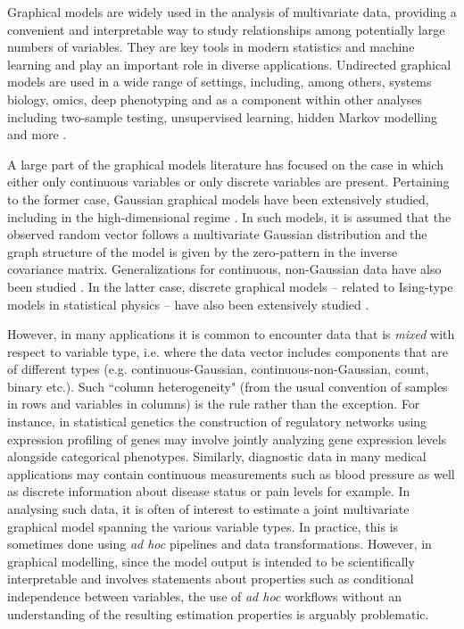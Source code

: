 Graphical models are widely used in the analysis of multivariate data, providing a convenient and interpretable way to study relationships among potentially large numbers of variables. They are key tools in modern statistics and machine learning and play an important role in diverse applications. Undirected graphical models are used in a wide range of settings, including, among others, systems biology, omics, deep phenotyping \citep[see, e.g.][]{dobra2004,Finegold11,monti2014}
and as a component within other analyses including two-sample testing, unsupervised learning, hidden Markov modelling and more  \citep[examples include][]{wei2007,verzelen2009,stadler2013, stadler2015,perrakis2021}. 

A large part of the graphical models literature has focused on the case in which either only continuous variables or only discrete variables are present. 
Pertaining to the former case, Gaussian graphical models have been extensively studied, including in the high-dimensional regime \citep[see among others][]{Meinshausen06,Friedman08,Banerjee08,Lam09,Yuan10,Ravikumar11,Cai11}. In such models, it is assumed that the observed random vector follows a multivariate Gaussian distribution and the graph structure of the model is given by the zero-pattern in the inverse covariance matrix. Generalizations for continuous, non-Gaussian data have also been studied \citep{Miyamura06,Liu09,Finegold11}. In the latter case, discrete graphical models -- related to Ising-type models in statistical physics -- have also been extensively studied \citep[see e.g.][]{wainwright2006,ravikumar2010}. 

However, in many applications it is common to encounter data that is {\it mixed} with respect to variable type, i.e. where the data vector includes components that are of different types (e.g. continuous-Gaussian, continuous-non-Gaussian, count, binary etc.). Such ``column heterogeneity" (from the usual convention of samples in rows and variables in columns) is the rule rather than the exception. 
For instance, in statistical genetics the construction of regulatory networks using expression profiling of genes may involve jointly analyzing gene expression levels alongside categorical phenotypes. Similarly, diagnostic data in many medical applications may contain continuous measurements such as blood pressure as well as discrete information about disease status or pain levels for example.      
In analysing such data, it is often of interest to estimate a joint multivariate graphical model spanning the various variable types. In practice, this is sometimes done using {\it ad hoc} pipelines and data transformations. However, in graphical modelling, since the model output 
is intended to be scientifically interpretable and 
involves statements about properties such as conditional independence between variables, the use of {\it ad hoc} workflows without an understanding of the resulting estimation properties is arguably problematic.

